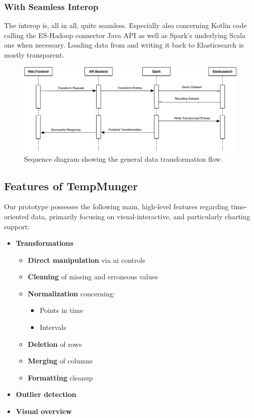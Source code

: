 \subsubsection{With Seamless Interop}

The interop is, all in all, quite seamless.
Especially also concerning Kotlin code calling the ES-Hadoop connector Java \textsc{API} as well as Spark's underlying Scala one when necessary.
Loading data from and writing it back to Elasticsearch is mostly transparent.

\begin{figure}[h]
  \centering
  \includegraphics[width=1.05\textwidth]{figures/implementation/transformation-sequence}
  \caption{Sequence diagram showing the general data transformation flow.}
  \label{fig:transformation-sequence}
\end{figure}


\subsection{Features of TempMunger}

Our prototype possesses the following main, high-level features regarding time-oriented data, primarily focusing on visual-interactive, and particularly charting support:

\begin{itemize}
  \item \textbf{Transformations}
  \begin{itemize}
    \item \textbf{Direct manipulation} via \gls{ui} controls
    \item \textbf{Cleaning} of missing and erroneous values
    \item \textbf{Normalization} concerning:
    \begin{itemize}
      \item Points in time
      \item Intervals
    \end{itemize}
    \item \textbf{Deletion} of rows
    \item \textbf{Merging} of columns
    \item \textbf{Formatting} cleanup
  \end{itemize}
  \item \textbf{Outlier detection}
  \item \textbf{Visual overview}
\end{itemize}

